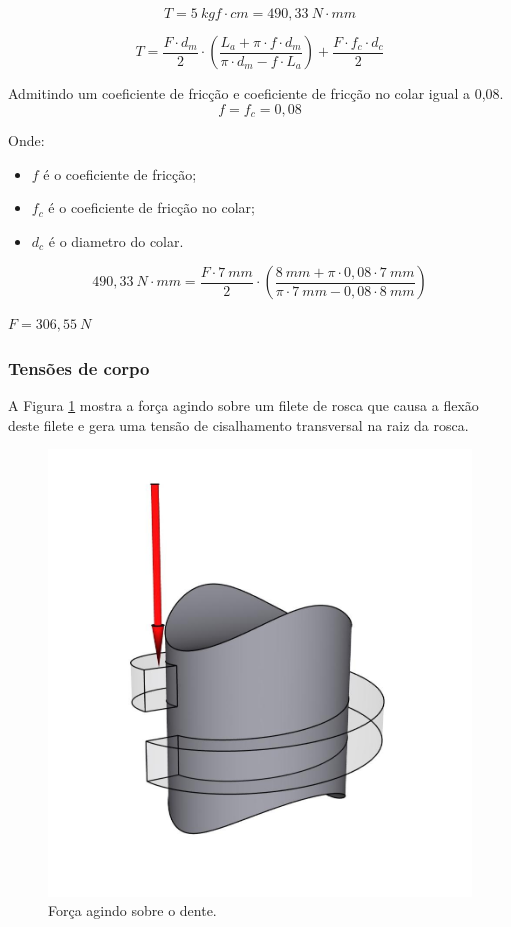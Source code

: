$$T = 5~kgf \cdot cm = 490,33~N \cdot mm$$

\begin{equation}\label{eq:torque}
T = \frac{F \cdot d_{m}}{2} \cdot (\frac{L_{a} + \pi \cdot f \cdot d_{m}}{\pi \cdot d_{m} - f \cdot L_{a}}) + \frac{F \cdot f_{c} \cdot d_{c}}{2}
\end{equation}

Admitindo um coeficiente de fricção e coeficiente de fricção no colar igual a 0,08.
$$f = f_{c} = 0,08$$

Onde:
\begin{itemize}
    \item $f$ é o coeficiente de fricção;
    \item $f_{c}$ é o coeficiente de fricção no colar;
    \item $d_{c}$ é o diametro do colar.
\end{itemize}

$$490,33~N \cdot mm = \frac{F \cdot 7~mm}{2} \cdot (\frac{8~mm + \pi \cdot 0,08 \cdot 7~mm}{\pi \cdot 7~mm - 0,08 \cdot 8~mm})$$

$F = 306,55~N$

\subsubsection{Tensões de corpo}

A Figura \ref{fig:forcadente} mostra a força agindo sobre um filete de rosca que causa 
a flexão deste filete e gera uma tensão de cisalhamento transversal na raiz da rosca.

\begin{figure}[H]
\centering
\caption{Força agindo sobre o dente.}\label{fig:forcadente}
\includegraphics[scale = 0.2]{figuras/forcadente}
\end{figure}

